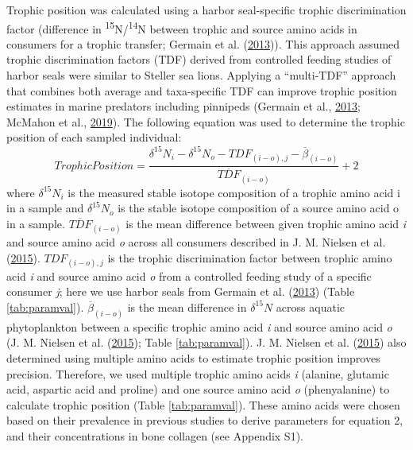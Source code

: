 \documentclass [11pt, proquest] {uwthesis}[2015/03/03]
\begin{document}
Trophic position was calculated using a harbor seal-specific trophic
discrimination factor (difference in
\textsuperscript{15}N/\textsuperscript{14}N between trophic and source
amino acids in consumers for a trophic transfer; Germain et al.
(\protect\hyperlink{ref-Germain2013}{2013})). This approach assumed
trophic discrimination factors (TDF) derived from controlled feeding
studies of harbor seals were similar to Steller sea lions. Applying a
``multi-TDF'' approach that combines both average and taxa-specific TDF
can improve trophic position estimates in marine predators including
pinnipeds (Germain et al., \protect\hyperlink{ref-Germain2013}{2013};
McMahon et al., \protect\hyperlink{ref-McMahon2019}{2019}). The
following equation was used to determine the trophic position of each
sampled individual:
\begin{equation} 
Trophic Position =   
  \frac{\delta^{15}N_i - \delta^{15}N_o - TDF_{(i-o),j} - \overline{\beta}_{(i-o)}}{\overline{TDF}_{(i-o)}}+2
  \label{eq:TP}
\end{equation}
where \(\delta^{15}N_i\) is the measured stable isotope composition of a
trophic amino acid i in a sample and \(\delta^{15}N_o\) is the stable
isotope composition of a source amino acid o in a sample.
\(\overline{TDF}_{(i-o)}\) is the mean difference between given trophic
amino acid \emph{i} and source amino acid \emph{o} across all consumers
described in J. M. Nielsen et al.
(\protect\hyperlink{ref-Nielsen2015}{2015}). \(TDF_{(i-o), j}\) is the
trophic discrimination factor between trophic amino acid \emph{i} and
source amino acid \emph{o} from a controlled feeding study of a specific
consumer \emph{j}; here we use harbor seals from Germain et al.
(\protect\hyperlink{ref-Germain2013}{2013}) (Table \ref{tab:paramval}).
\(\overline\beta_{(i-o)}\) is the mean difference in \(\delta^{15}N\)
across aquatic phytoplankton between a specific trophic amino acid
\emph{i} and source amino acid \emph{o} (J. M. Nielsen et al.
(\protect\hyperlink{ref-Nielsen2015}{2015}); Table \ref{tab:paramval}).
J. M. Nielsen et al. (\protect\hyperlink{ref-Nielsen2015}{2015}) also
determined using multiple amino acids to estimate trophic position
improves precision. Therefore, we used multiple trophic amino acids
\emph{i} (alanine, glutamic acid, aspartic acid and proline) and one
source amino acid \emph{o} (phenyalanine) to calculate trophic position
(Table \ref{tab:paramval}). These amino acids were chosen based on their
prevalence in previous studies to derive parameters for equation 2, and
their concentrations in bone collagen (see Appendix S1).
\end{document}
